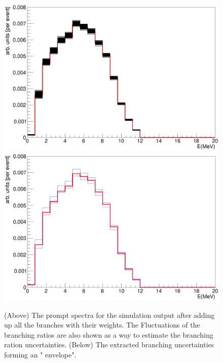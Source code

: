\documentclass{JINST}
\begin{document}
       \begin{figure}[htp]
 \begin{center}
  \includegraphics[scale=0.65]{MC_full_withErrors.eps}
  \includegraphics[scale=0.65]{MC_full.eps}
   \label{MC_full}
    \end{center}
    \caption{ (Above) The prompt spectra for the \liNINE simulation output after adding up all the branches with their weights. The Fluctuations of the branching ratios 
    are also shown as a way to estimate the branching ration uncertainties. (Below) The extracted branching uncertainties forming an " envelope". }
 \end{figure}

       


  
\end{document}
